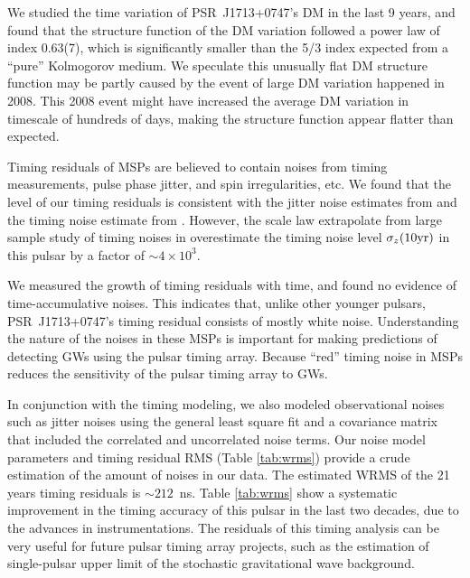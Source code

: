 {\bfref 
We studied the time variation of PSR~J1713+0747's DM in the last 9 years, and found that 
the structure function of the DM variation followed a power law of 
index 0.63(7), which is significantly smaller than the 5/3 index expected from a ``pure''
Kolmogorov medium. We speculate this unusually flat DM structure function may
be partly caused by the event of large DM variation happened in 2008. This
2008 event might have increased the average DM variation in timescale of
hundreds of days, making the structure function appear flatter than expected.

Timing residuals of MSPs are believed to contain noises from timing
measurements, pulse phase jitter, and spin irregularities, etc. 
We found that the level of our timing residuals is consistent with the jitter
noise estimates from \citet{sc12} and the timing noise estimate from \citet{sc10}. However,
the scale law extrapolate from large sample study of timing noises in \citet{hlk10}
overestimate the timing noise level $\sigma_z({\rm 10 yr})$ in this pulsar by
a factor of $\sim4\times10^3$.

We measured the growth of timing residuals with time, and found no evidence of
time-accumulative noises. This indicates that, unlike other younger pulsars,
PSR~J1713+0747's timing residual consists of mostly white noise. Understanding the nature 
of the noises in these MSPs is important for making predictions of detecting
GWs using the pulsar timing array. Because ``red'' timing noise in MSPs reduces
the sensitivity of the pulsar timing array to GWs.

In conjunction with the timing modeling, we also modeled observational noises
such as jitter noises
 using the general least square fit and a covariance matrix that included the
correlated and uncorrelated noise terms.
Our noise model parameters and timing residual RMS (Table \ref{tab:wrms}) provide a crude estimation of the amount of noises in our data. The estimated
WRMS of the 21 years timing residuals is $\sim 212$~ns. 
Table \ref{tab:wrms} show a systematic improvement in the timing accuracy of
this pulsar in the last two decades, due to the advances in instrumentations.
The residuals of this timing analysis can be very useful for future pulsar timing array
projects, such as the estimation of single-pulsar upper limit of the stochastic gravitational wave background.
}



